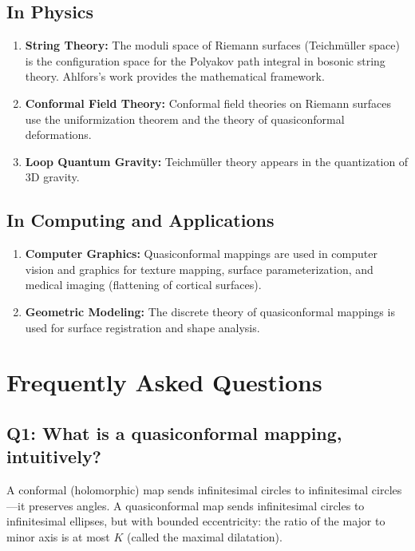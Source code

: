 \subsection{In Physics}

\begin{enumerate}
    \item \textbf{String Theory:} The moduli space of Riemann surfaces (Teichm{\"u}ller space) is the configuration space for the Polyakov path integral in bosonic string theory. Ahlfors's work provides the mathematical framework.
    \item \textbf{Conformal Field Theory:} Conformal field theories on Riemann surfaces use the uniformization theorem and the theory of quasiconformal deformations.
    \item \textbf{Loop Quantum Gravity:} Teichm{\"u}ller theory appears in the quantization of 3D gravity.
\end{enumerate}

\subsection{In Computing and Applications}

\begin{enumerate}
    \item \textbf{Computer Graphics:} Quasiconformal mappings are used in computer vision and graphics for texture mapping, surface parameterization, and medical imaging (flattening of cortical surfaces).
    \item \textbf{Geometric Modeling:} The discrete theory of quasiconformal mappings is used for surface registration and shape analysis.
\end{enumerate}

\section{Frequently Asked Questions}

\subsection*{Q1: What is a quasiconformal mapping, intuitively?}

A conformal (holomorphic) map sends infinitesimal circles to infinitesimal circles---it preserves angles. A quasiconformal map sends infinitesimal circles to infinitesimal ellipses, but with bounded eccentricity: the ratio of the major to minor axis is at most $K$ (called the maximal dilatation).

